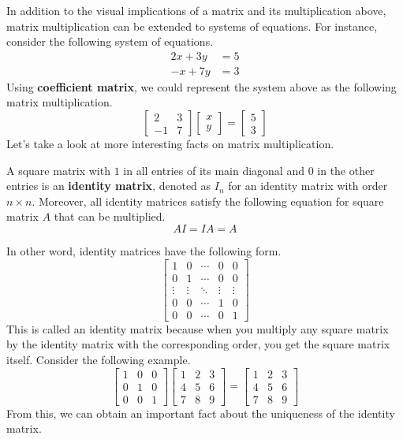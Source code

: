 \documentclass[../main.tex]{subfiles}
\begin{document}
In addition to the visual implications of a matrix and its
multiplication above, matrix multiplication can be extended to
systems of equations. For instance, consider the following system
of equations.
\begin{align*}
    2x + 3y &= 5 \\
    -x + 7y &= 3
\end{align*}
Using \textbf{coefficient matrix}, we could represent the system
above as the following matrix multiplication.
\[
\begin{bmatrix}
    2  & 3 \\
    -1 & 7
\end{bmatrix}
\begin{bmatrix}
    x \\
    y
\end{bmatrix}
=
\begin{bmatrix}
    5 \\
    3
\end{bmatrix}
\]
Let's take a look at more interesting facts on matrix multiplication.

\begin{definition}
A square matrix with $1$ in all entries of its main diagonal and
$0$ in the other entries is an \textbf{identity matrix}, denoted as
$I_n$ for an identity matrix with order $n \times n$. Moreover,
all identity matrices satisfy the following equation for square
matrix $A$ that can be multiplied.
\[
AI = IA = A
\]
\end{definition}

In other word, identity matrices have the following form.
\[
\begin{bmatrix}
    1 & 0 & \cdots & 0 & 0 \\
    0 & 1 & \cdots & 0 & 0 \\
    \vdots & \vdots & \ddots & \vdots & \vdots \\
    0 & 0 & \cdots & 1 & 0 \\
    0 & 0 & \cdots & 0 & 1
\end{bmatrix}
\]
This is called an identity matrix because when you multiply any
square matrix by the identity matrix with the corresponding order,
you get the square matrix itself. Consider the following example.
\[
\begin{bmatrix}
    1 & 0 & 0 \\
    0 & 1 & 0 \\
    0 & 0 & 1
\end{bmatrix}
\begin{bmatrix}
    1 & 2 & 3 \\
    4 & 5 & 6 \\
    7 & 8 & 9
\end{bmatrix}
=
\begin{bmatrix}
    1 & 2 & 3 \\
    4 & 5 & 6 \\
    7 & 8 & 9
\end{bmatrix}
\]
From this, we can obtain an important fact about the uniqueness
of the identity matrix.
\end{document}
